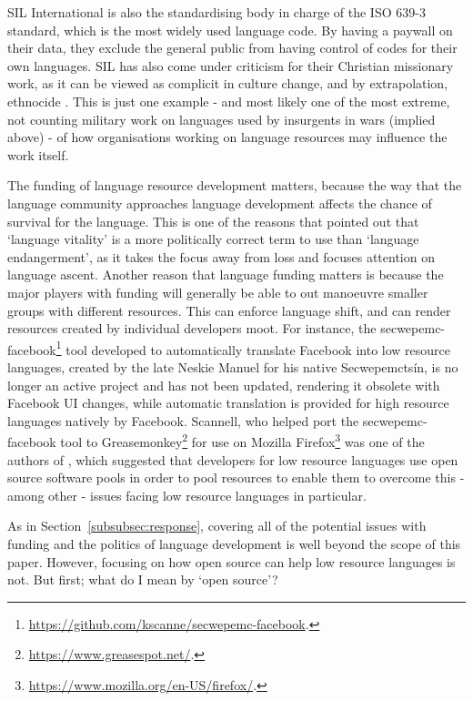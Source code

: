 SIL International is also the standardising body in charge of the ISO 639-3 standard, which is the most widely used language code. By having a paywall on their data, they exclude the general public from having control of codes for their own languages. SIL has also come under criticism for their Christian missionary work, as it can be viewed as complicit in culture change, and by extrapolation, ethnocide \citep{dobrin2009sil, dobrin2009practical, everett2009don}. This is just one example - and most likely one of the most extreme, not counting military work on languages used by insurgents in wars (implied above) - of how organisations working on language resources may influence the work itself. 

The funding of language resource development matters, because the way that the language community approaches language development affects the chance of survival for the language. This is one of the reasons that \citet{grenoble2016response} pointed out that `language vitality' is a more politically correct term to use than `language endangerment', as it takes the focus away from loss and focuses attention on language ascent. Another reason that language funding matters is because the major players with funding will generally be able to out manoeuvre smaller groups with different resources. This can enforce language shift, and can render resources created by individual developers moot. For instance, the secwepemc-facebook\footnote{\href{https://github.com/kscanne/secwepemc-facebook}{https://github.com/kscanne/secwepemc-facebook}. } tool developed to automatically translate Facebook into low resource languages, created by the late Neskie Manuel for his native Secwepemcts\'in, is no longer an active project and has not been updated, rendering it obsolete with Facebook UI changes, while automatic translation is provided for high resource languages natively by Facebook. Scannell, who helped port the secwepemc-facebook tool to Greasemonkey\footnote{\href{https://www.greasespot.net/}{https://www.greasespot.net/}. } for use on Mozilla Firefox\footnote{\href{https://www.mozilla.org/en-US/firefox/}{https://www.mozilla.org/en-US/firefox/}. } was one of the authors of \citet{streiter2006implementing}, which suggested that developers for low resource languages use open source software pools in order to pool resources to enable them to overcome this - among other - issues facing low resource languages in particular.

As in Section~\ref{subsubsec:response}, covering all of the potential issues with funding and the politics of language development is well beyond the scope of this paper. However, focusing on how open source can help low resource languages is not. But first; what do I mean by `open source'?
